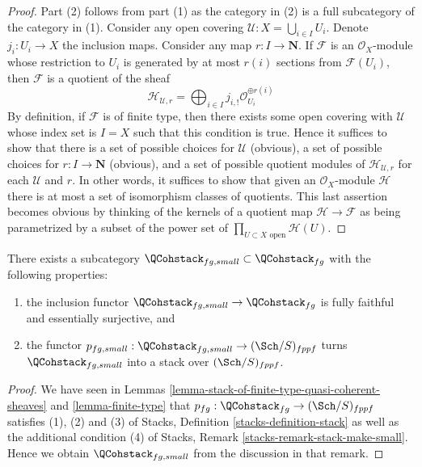 \begin{proof}
Part (2) follows from part (1) as the category in (2) is a full subcategory
of the category in (1). Consider any open covering
$\mathcal{U} : X = \bigcup_{i \in I} U_i$. Denote $j_i : U_i \to X$
the inclusion maps. Consider any map $r : I \to \mathbf{N}$.
If $\mathcal{F}$ is an $\mathcal{O}_X$-module whose restriction to
$U_i$ is generated by at most $r(i)$ sections from $\mathcal{F}(U_i)$,
then $\mathcal{F}$ is a quotient of the sheaf
$$
\mathcal{H}_{\mathcal{U}, r} =
\bigoplus\nolimits_{i \in I} j_{i, !}\mathcal{O}_{U_i}^{\oplus r(i)}
$$
By definition, if $\mathcal{F}$ is of finite type, then there exists
some open covering with $\mathcal{U}$ whose index set is $I = X$
such that this condition is true. Hence it suffices to show that
there is a set of possible choices for $\mathcal{U}$ (obvious),
a set of possible choices for $r : I \to \mathbf{N}$ (obvious), and
a set of possible quotient modules of $\mathcal{H}_{\mathcal{U}, r}$
for each $\mathcal{U}$ and $r$. In other words, it suffices to show
that given an $\mathcal{O}_X$-module $\mathcal{H}$ there is at most
a set of isomorphism classes of quotients.
This last assertion becomes obvious
by thinking of the kernels of a quotient map
$\mathcal{H} \to \mathcal{F}$
as being parametrized by a subset of the power set of
$\prod_{U \subset X\text{ open}} \mathcal{H}(U)$.
\end{proof}

\begin{lemma}
\label{lemma-stack-fg-quasi-coherent}
There exists a subcategory
$\QCohstack_{fg, small} \subset \QCohstack_{fg}$
with the following properties:
\begin{enumerate}
\item the inclusion functor
$\QCohstack_{fg, small} \to \QCohstack_{fg}$ is
fully faithful and essentially surjective, and
\item the functor
$p_{fg, small} : \QCohstack_{fg, small} \to (\Sch/S)_{fppf}$
turns $\QCohstack_{fg, small}$ into a stack over $(\Sch/S)_{fppf}$.
\end{enumerate}
\end{lemma}

\begin{proof}
We have seen in
Lemmas \ref{lemma-stack-of-finite-type-quasi-coherent-sheaves} and
\ref{lemma-finite-type}
that $p_{fg} : \QCohstack_{fg} \to (\Sch/S)_{fppf}$
satisfies (1), (2) and (3) of
Stacks, Definition \ref{stacks-definition-stack}
as well as the additional condition (4) of
Stacks, Remark \ref{stacks-remark-stack-make-small}.
Hence we obtain $\QCohstack_{fg, small}$ from the discussion
in that remark.
\end{proof}

